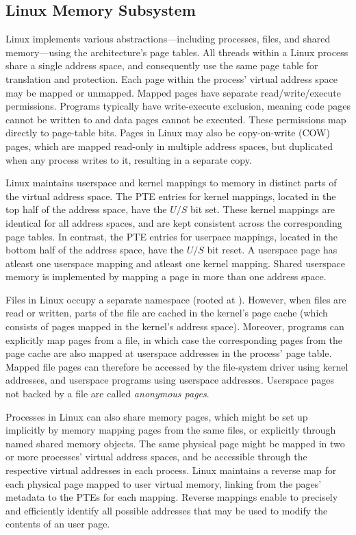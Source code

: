 \subsection{Linux Memory Subsystem}

Linux implements various abstractions---including processes, files, and shared
memory---using the architecture's page tables.
All threads within a Linux process share a single address space, and
consequently use the same page table for translation and protection.
Each page within the process' virtual address space may be mapped or
unmapped. 
Mapped pages have separate read/write/execute permissions.
Programs typically have write-execute exclusion, meaning
code pages cannot be written to and data pages cannot be executed.
These permissions map directly to page-table bits.
Pages in Linux may also be copy-on-write (COW) pages, which are mapped 
read-only in multiple address spaces, but duplicated when any process writes
to it, resulting in a separate copy.

Linux maintains userspace and kernel mappings to memory in distinct
parts of the virtual address space.
The PTE entries for kernel mappings, located in the top half of the
address space, have the $U/S$ bit set.
These kernel mappings are identical for all address spaces, and are
kept consistent across the corresponding page tables.
In contrast, the PTE entries for userpace mappings, located in the 
bottom half of the address space, have the $U/S$ bit reset.
A userspace page has atleast one userspace mapping and atleast one
kernel mapping.
Shared userspace memory is implemented by mapping a page in more than
one address space.

Files in Linux occupy a separate namespace (rooted at \Code{/}).
However, when files are read or written, parts of the file are cached
in the kernel's page cache (which consists of pages mapped in the kernel's
address space).
Moreover, programs can explicitly map pages from a file, in which case
the corresponding pages from the page cache are also mapped at userspace
addresses in the process' page table.
Mapped file pages can therefore be accessed by the file-system driver using
kernel addresses, and userspace programs using userspace addresses.
Userspace pages not backed by a file are called \emph{anonymous pages}.

Processes in Linux can also share memory pages, which might be set up
implicitly by memory mapping pages from the same files, or explicitly
through named shared memory objects.
The same physical page might be mapped in two or more processes'
virtual address spaces, and be accessible through the respective
virtual addresses in each process.
Linux maintains a reverse map for each physical page mapped to user virtual
memory, linking from the pages' metadata to the PTEs for each mapping.
Reverse mappings enable \midas to precisely and efficiently identify all 
possible addresses that may be used to modify the contents of an user page.


